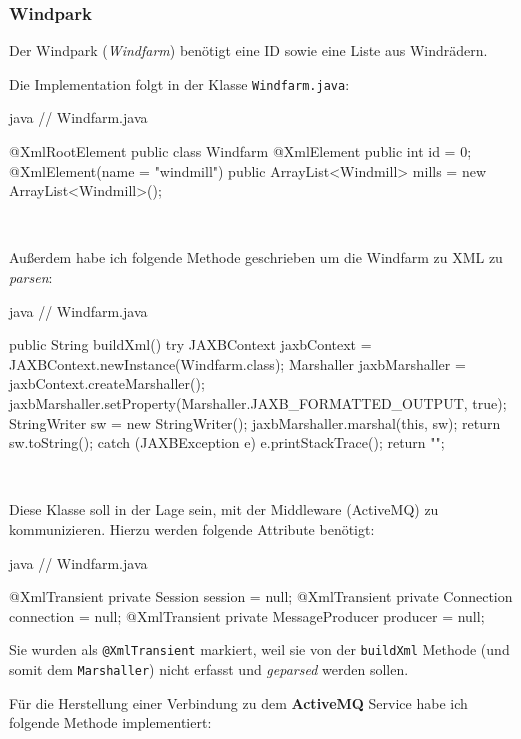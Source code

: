 \clearpage
\subsubsection{Windpark}
\label{sec:windfarm}

Der Windpark (\textit{Windfarm}) benötigt eine ID sowie eine Liste aus Windrädern.

Die Implementation folgt in der Klasse \texttt{Windfarm.java}:

\begin{code}{java}
// Windfarm.java

@XmlRootElement
public class Windfarm {
    @XmlElement
    public int id = 0;
    @XmlElement(name = "windmill")
    public ArrayList<Windmill> mills = new ArrayList<Windmill>();
}
\end{code}

\

Außerdem habe ich folgende Methode geschrieben um die Windfarm zu XML zu \textit{parsen}:

\begin{code}{java}
    // Windfarm.java

    public String buildXml() {
        try {
            JAXBContext jaxbContext = JAXBContext.newInstance(Windfarm.class);
            Marshaller jaxbMarshaller = jaxbContext.createMarshaller();
            jaxbMarshaller.setProperty(Marshaller.JAXB_FORMATTED_OUTPUT, true);
            StringWriter sw = new StringWriter();
            jaxbMarshaller.marshal(this, sw);
            return sw.toString();
        } catch (JAXBException e) {
            e.printStackTrace();
            return "";
        }
    }
\end{code}

\

Diese Klasse soll in der Lage sein, mit der Middleware (ActiveMQ) zu kommunizieren. Hierzu werden folgende Attribute benötigt:

\begin{code}{java}
// Windfarm.java

@XmlTransient
private Session session = null;
@XmlTransient
private Connection connection = null;
@XmlTransient
private MessageProducer producer = null;
\end{code}

Sie wurden als \texttt{@XmlTransient} markiert, weil sie von der \texttt{buildXml} Methode (und somit dem \texttt{Marshaller}) nicht erfasst und \textit{geparsed} werden sollen.

Für die Herstellung einer Verbindung zu dem \textbf{ActiveMQ} Service habe ich folgende Methode implementiert:


